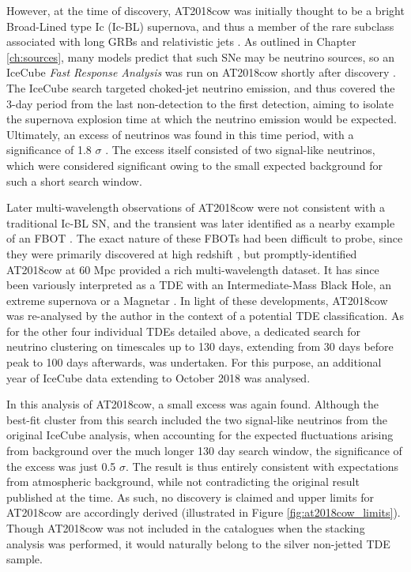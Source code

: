 However, at the time of discovery, AT2018cow was initially thought to be a bright Broad-Lined type Ic (Ic-BL) supernova, and thus a member of the rare subclass associated with long GRBs and relativistic jets . As outlined in Chapter \ref{ch:sources}, many models predict that such SNe may be neutrino sources, so an IceCube \emph{Fast Response Analysis} was run on AT2018cow shortly after discovery . The IceCube search targeted choked-jet neutrino emission, and thus covered the 3-day period from the last non-detection to the first detection, aiming to isolate the supernova explosion time at which the neutrino emission would be expected. Ultimately, an excess of neutrinos was found in this time period, with a significance of 1.8 $\sigma$ . The excess itself consisted of two signal-like neutrinos, which were considered significant owing to the small expected background for such a short search window.

Later multi-wavelength observations of AT2018cow were not consistent with a traditional Ic-BL SN, and the transient was later identified as a nearby example of an FBOT . The exact nature of these FBOTs had been difficult to probe, since they were primarily discovered at high redshift , but promptly-identified AT2018cow at 60 Mpc provided a rich multi-wavelength dataset. It has since been variously interpreted as a TDE with an Intermediate-Mass Black Hole, an extreme supernova or a Magnetar . In light of these developments, AT2018cow was re-analysed by the author in the context of a potential TDE classification. As for the other four individual TDEs detailed above, a dedicated search for neutrino clustering on timescales up to 130 days, extending from 30 days before peak to 100 days afterwards, was undertaken.  For this purpose, an additional year of IceCube data extending to October 2018 was analysed.

In this analysis of AT2018cow, a small excess was again found. Although the best-fit cluster from this search included the two signal-like neutrinos from the original IceCube analysis, when accounting for the expected fluctuations arising from background over the much longer 130 day search window, the significance of the excess was just 0.5 $\sigma$. The result is thus entirely consistent with expectations from atmospheric background, while not contradicting the original result published at the time. As such, no discovery is claimed and upper limits for AT2018cow are accordingly derived (illustrated in Figure \ref{fig:at2018cow_limits}). Though AT2018cow was not included in the catalogues when the stacking analysis was performed, it would naturally belong to the silver non-jetted TDE sample. 

